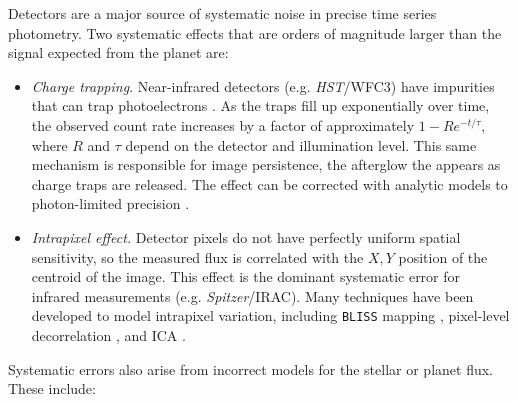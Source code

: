 \documentclass[graybox,natbib,nosecnum]{svmult}
\newcommand{\project}[1]{\textsl{#1}}
\newcommand{\HST}{\project{HST}}
\newcommand{\Spitzer}{\project{Spitzer}}
\begin{document}
Detectors are a major source of systematic noise in precise time series photometry. Two systematic effects that are orders of magnitude larger than the signal expected from the planet are: 

\begin{itemize}
\item{\emph{Charge trapping}. Near-infrared detectors (e.g. \HST/WFC3) have impurities that can trap photoelectrons \citep{smith08}. As the traps fill up exponentially over time, the observed count rate increases by a factor of approximately $1 - R e^{-t/\tau}$, where $R$ and $\tau$ depend on the detector and illumination level.  This same mechanism is responsible for image persistence, the afterglow the appears as charge traps are released. The effect can be corrected with analytic models to photon-limited precision \citep{deming13, line16}. 
}
\item{\emph{Intrapixel effect.} Detector pixels do not have perfectly uniform spatial sensitivity, so the measured flux is correlated with the $X, Y$ position of the centroid of the image. This effect is the dominant systematic error for infrared measurements (e.g. \Spitzer/IRAC). Many techniques have been developed to model intrapixel variation, including \texttt{BLISS} mapping \citep{stevenson12}, pixel-level decorrelation \citep{deming15}, and ICA \citep{morello15}.}
\end{itemize}

Systematic errors also arise from incorrect models for the stellar or planet flux. These include: 
\end{document}
